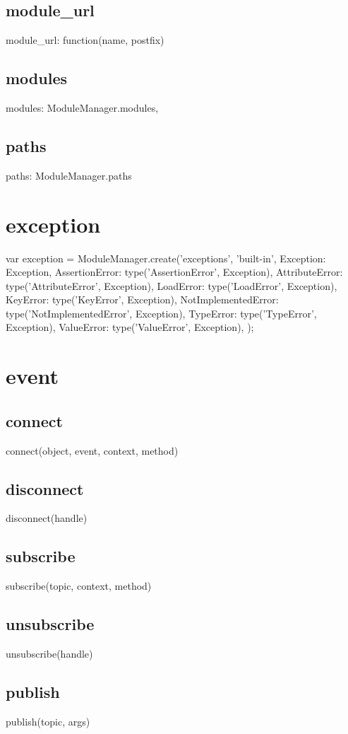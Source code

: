 \subsection*{module\_url}
module\_url: function(name, postfix) {
\subsection*{modules}
modules: ModuleManager.modules,
\subsection*{paths}
paths: ModuleManager.paths

\section{exception}
var exception = ModuleManager.create('exceptions', 'built-in', {
        Exception: Exception,
        AssertionError: type('AssertionError', Exception),
        AttributeError: type('AttributeError', Exception),
        LoadError: type('LoadError', Exception),
        KeyError: type('KeyError', Exception),
        NotImplementedError: type('NotImplementedError', Exception),
        TypeError: type('TypeError', Exception),
        ValueError: type('ValueError', Exception),
    });

\section{event}
\subsection*{connect}
connect(object, event, context, method) {
\subsection*{disconnect}
disconnect(handle) {
\subsection*{subscribe}
subscribe(topic, context, method) {
\subsection*{unsubscribe}
unsubscribe(handle) {
\subsection*{publish}
publish(topic, args) {
}}}}}}
